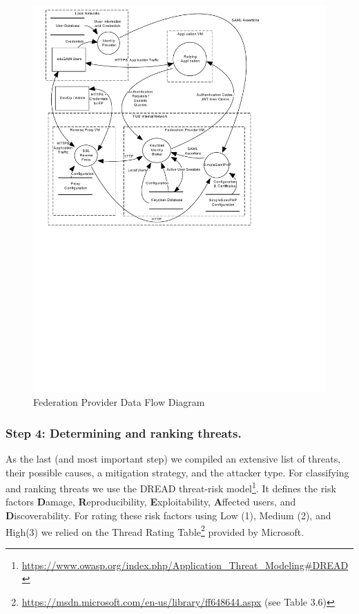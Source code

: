 \documentclass{llncs}
\begin{document}
\begin{figure}
	\vspace*{-0.5cm}
	\centering
	\includegraphics[width=\columnwidth, clip=true, trim=0.9cm 12.4cm 5cm 0.3cm]{data_flow}
	\caption{Federation Provider Data Flow Diagram}
	\label{fig:dataflow}
\end{figure}
	
\subsubsection{Step 4: Determining and ranking threats.}

As the last (and most important step) we compiled an extensive list of threats, their possible causes, a mitigation strategy, and the attacker type. For classifying and ranking threats we use the DREAD threat-risk model\footnote{\url{https://www.owasp.org/index.php/Application\_Threat\_Modeling\#DREAD}}. It defines the risk factors \textbf{D}amage, \textbf{R}eproducibility, \textbf{E}xploitability, \textbf{A}ffected users, and \textbf{D}iscoverability. For rating these risk factors using Low (1), Medium (2), and High(3) we relied on the Thread Rating Table\footnote{\url{https://msdn.microsoft.com/en-us/library/ff648644.aspx} (see Table 3.6)} provided by Microsoft.
\end{document}
